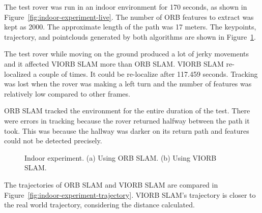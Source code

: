 The test rover was run in an indoor environment for 170 seconds, as shown in Figure~\ref{fig:indoor-experiment-live}. The number of ORB features to extract was kept as 2000. The approximate length of the path was 17 meters. The keypoints, trajectory, and pointclouds generated by both algorithms are shown in Figure~\ref{fig:indoor-path-visualization}.

The test rover while moving on the ground produced a lot of jerky movements and it affected VIORB SLAM more than ORB SLAM. VIORB SLAM re-localized a couple of times. It could be re-localize after 117.459 seconds. Tracking was lost when the rover was making a left turn and the number of features was relatively low compared to other frames.

ORB SLAM tracked the environment for the entire duration of the test. There were errors in tracking because the rover returned halfway between the path it took. This was because the hallway was darker on its return path and features could not be detected precisely. 


\begin{figure}[h]
	
	\caption[Indoor experiment.]{\small 
		Indoor experiment. (a) Using ORB SLAM. (b) Using VIORB SLAM.}
	\label{fig:indoor-path-visualization}
	
\end{figure}

The trajectories of ORB SLAM and VIORB SLAM are compared in Figure~\ref{fig:indoor-experiment-trajectory}. VIORB SLAM's trajectory is closer to the real world trajectory, considering the distance calculated.

